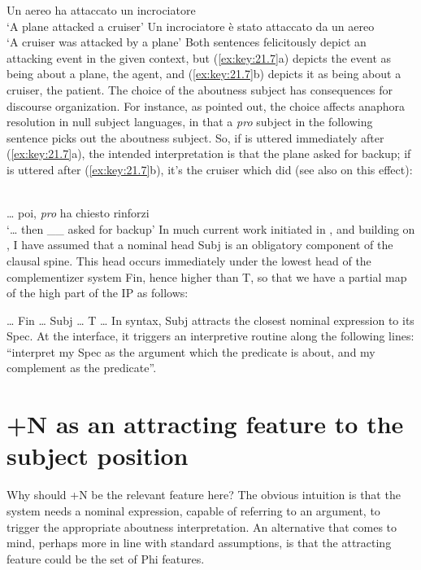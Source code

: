 \documentclass[output=paper]{langsci/langscibook}
\begin{document}
\begin{exe}
\ea%
\label{ex:key:21.7}
    \ea Un aereo ha attaccato un incrociatore\\
         ‘A plane   attacked      a cruiser’
    \ex Un incrociatore è stato attaccato  da un aereo\\
         ‘A cruiser          was attacked       by a plane’
    \z
\z
%
Both sentences felicitously depict an attacking event in the given context, but
(\ref{ex:key:21.7}a) depicts the event as being about a plane, the agent, and
(\ref{ex:key:21.7}b) depicts it as being about a cruiser, the patient. The
choice of the aboutness subject has consequences for discourse organization.
For instance, as \citet{Calabrese1986} pointed out, the choice affects anaphora
resolution in null subject languages, in that a \emph{pro} subject in the
following sentence picks out the aboutness subject. So, if  is
uttered immediately after (\ref{ex:key:21.7}a), the intended interpretation is
that the plane asked for backup; if  is uttered after
(\ref{ex:key:21.7}b), it’s the cruiser which did (see also
\citealt{BellettiEtAl2007} on this effect):

\ea%
    \label{ex:key:21.8}\\
    \dots{} poi, \emph{pro} ha chiesto rinforzi\\
    ‘\dots{} then \_\_ asked for backup’
\z
%
In much current work initiated in \citet{rizzicriterial}, and building on
\citet{Cardinaletti:2004a}, I have assumed that a nominal head Subj is an
obligatory component of the clausal spine. This head occurs immediately under
the lowest head of the complementizer system Fin, hence higher than T, so that
we have a partial map of the high part of the IP as follows:

\ea%
    \label{ex:key:21.9}
    \dots{} Fin \dots{} Subj\tss{[+N]} \dots{} T \dots{}
\z
%
In syntax, Subj\tss{[+N]} attracts the closest nominal expression to its Spec.
At the interface, it triggers an interpretive routine along the following
lines: “interpret my Spec as the argument which the predicate is about, and my
complement as the predicate”.

\section{+N as an attracting feature to the subject position}

Why should +N be the relevant feature here? The obvious intuition is that the
system needs a nominal expression, capable of referring to an argument, to
trigger the appropriate aboutness interpretation. An alternative that comes to
mind, perhaps more in line with standard assumptions, is that the attracting
feature could be the set of Phi features.


\end{exe}
\end{document}
